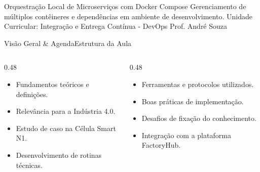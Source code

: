 
\senaicover
  {Orquestração Local de Microserviços com Docker Compose}
  {Gerenciamento de múltiplos contêineres e dependências em ambiente de desenvolvimento.}
  {Unidade Curricular: Integração e Entrega Contínua - DevOps}
  {Prof. André Souza}

\begin{senaiframe}{Visão Geral \& Agenda}{Estrutura da Aula}
  \begin{columns}[t]
    \begin{column}{0.48\textwidth}
      \begin{tcolorbox}[senaibluecard, title={1. Conceitos Chave}]
        \begin{itemize}
          \item Fundamentos teóricos e definições.
          \item Relevância para a Indústria 4.0.
        \end{itemize}
      \end{tcolorbox}
      \vspace{4pt}
      \begin{tcolorbox}[senaiambercard, title={3. Aplicação Prática}]
        \begin{itemize}
          \item Estudo de caso na Célula Smart N1.
          \item Desenvolvimento de rotinas técnicas.
        \end{itemize}
      \end{tcolorbox}
    \end{column}
    \begin{column}{0.48\textwidth}
      \begin{tcolorbox}[senairedcard, title={2. Detalhamento Técnico}]
        \begin{itemize}
          \item Ferramentas e protocolos utilizados.
          \item Boas práticas de implementação.
        \end{itemize}
      \end{tcolorbox}
      \vspace{4pt}
      \begin{tcolorbox}[senaigreencard, title={4. Exercícios \& Avaliação}]
        \begin{itemize}
          \item Desafios de fixação do conhecimento.
          \item Integração com a plataforma FactoryHub.
        \end{itemize}
      \end{tcolorbox}
    \end{column}
  \end{columns}
\end{senaiframe}

